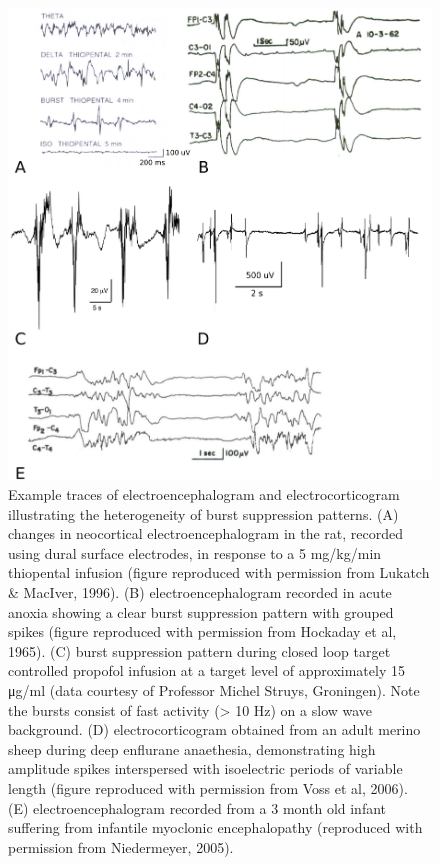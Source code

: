 \documentclass[a4paper,12pt]{article}
\begin{document}
\begin{figure}
	\label{fig:burst_examples}
	\includegraphics[scale=0.7]{chosen-frontiers-2012/burst_examples.pdf}
	\caption{Example traces of electroencephalogram and
electrocorticogram illustrating the heterogeneity of burst suppression
patterns. (A) changes in neocortical electroencephalogram in the rat,
recorded using dural surface electrodes, in response to a 5 mg/kg/min
thiopental infusion (figure reproduced with permission from Lukatch \&
MacIver, 1996). (B) electroencephalogram recorded in acute anoxia
showing a clear burst suppression pattern with grouped spikes (figure
reproduced with permission from Hockaday et al, 1965). (C) burst
suppression pattern during closed loop target controlled propofol
infusion at a target level of approximately 15 μg/ml (data courtesy of
Professor Michel Struys, Groningen). Note the bursts consist of fast
activity (> 10 Hz) on a slow wave background. (D) electrocorticogram
obtained from an adult merino sheep during deep enflurane anaethesia,
demonstrating high amplitude spikes interspersed with isoelectric
periods of variable length (figure reproduced with permission from
Voss et al, 2006). (E) electroencephalogram recorded from a 3 month
old infant suffering from infantile myoclonic encephalopathy
(reproduced with permission from Niedermeyer, 2005).}
\end{figure}
\end{document}
